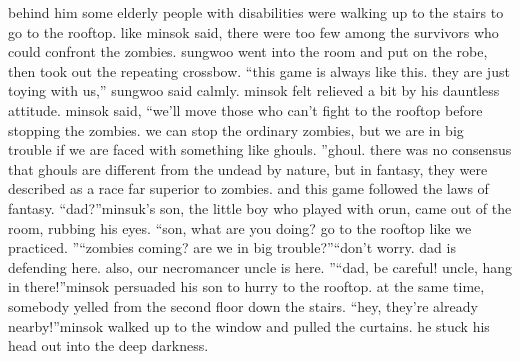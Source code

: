  behind him some elderly people with disabilities were walking up to the stairs to go to the rooftop.
 like minsok said, there were too few among the survivors who could confront the zombies.
sungwoo went into the room and put on the robe, then took out the repeating crossbow.
“this game is always like this.
 they are just toying with us,” sungwoo said calmly.
minsok felt relieved a bit by his dauntless attitude.
minsok said, “we’ll move those who can’t fight to the rooftop before stopping the zombies.
 we can stop the ordinary zombies, but we are in big trouble if we are faced with something like ghouls.
”ghoul.
 there was no consensus that ghouls are different from the undead by nature, but in fantasy, they were described as a race far superior to zombies.
 and this game followed the laws of fantasy.
“dad?”minsuk’s son, the little boy who played with orun, came out of the room, rubbing his eyes.
“son, what are you doing? go to the rooftop like we practiced.
”“zombies coming? are we in big trouble?”“don’t worry.
 dad is defending here.
 also, our necromancer uncle is here.
”“dad, be careful! uncle, hang in there!”minsok persuaded his son to hurry to the rooftop.
 at the same time, somebody yelled from the second floor down the stairs.
“hey, they’re already nearby!”minsok walked up to the window and pulled the curtains.
 he stuck his head out into the deep darkness.

